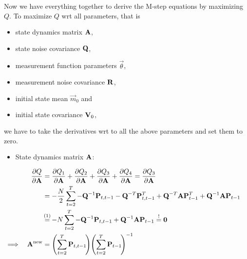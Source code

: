 	Now we have everything together to derive the M-step equations by maximizing \(Q\). To maximize \(Q\) \ac{wrt} all parameters, that is
	\begin{itemize}
		\item state dynamics matrix \(\boldsymbol{\mathrm{A}}\),
		\item state noise covariance \(\boldsymbol{\mathrm{Q}}\),
		\item measurement function parameters \(\vec{\theta}\),
		\item measurement noise covariance \(\boldsymbol{\mathrm{R}}\),
		\item initial state mean \(\vec{m}_0\) and
		\item initial state covariance \(\boldsymbol{\mathrm{V}}_0\),
	\end{itemize}
	we have to take the derivatives \ac{wrt} to all the above parameters and set them to zero.
	\begin{itemize}
		\item State dynamics matrix \(\boldsymbol{\mathrm{A}}\):
	\end{itemize}
	\begin{align}
		&&\pdv{Q}{\mat{A}}
			&= \pdv{Q_1}{\mat{A}} + \pdv{Q_2}{\mat{A}} + \pdv{Q_3}{\mat{A}} + \pdv{Q_4}{\mat{A}} = \pdv{Q_3}{\mat{A}} & \nonumber \\
		&&	&= -\frac{N}{2} \sum_{t = 2}^{T} -\mat{Q}^{-1} \mat{P}_{t, t - 1} - \mat{Q}^{-T} \mat{P}_{t, t - 1}^T + \mat{Q}^{-T} \mat{A} \mat{P}_{t - 1}^T + \mat{Q}^{-1} \mat{A} \mat{P}_{t - 1} & \nonumber \\
		&&	&\oversetfootnotemark{=} -N \sum_{t = 2}^{T} -\mat{Q}^{-1} \mat{P}_{t, t - 1} + \mat{Q}^{-1} \mat{A} \mat{P}_{t - 1} \overset{!}{=} \mat{0} & \nonumber \\
		\implies && \mat{A}^\new &= \Bigg(\! \sum_{t = 2}^{T} \mat{P}_{t, t - 1} \!\Bigg) \Bigg(\! \sum_{t = 2}^{T} \mat{P}_{t - 1} \!\Bigg)^{-1} & \label{eq:stateDynamicsMatrix}
	\end{align}

